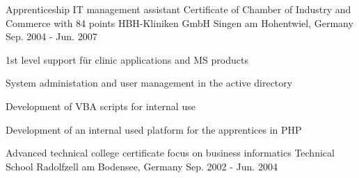

\begin{cventries}

  \cventry
    {Apprenticeship IT management assistant Certificate of Chamber of Industry and Commerce with 84 points} %
    {HBH-Kliniken GmbH} %
    {Singen am Hohentwiel, Germany} %
    {Sep. 2004 - Jun. 2007} %
    {
      \begin{cvitems} %
        \item {1st level support für clinic applications and MS products}
        \item {System administation and user management in the active directory}
        \item {Development of VBA scripts for internal use}
        \item {Development of an internal used platform for the apprentices in PHP}
      \end{cvitems}
    }

  \cventry
    {Advanced technical college certificate  focus on business informatics} %
    {Technical School} %
    {Radolfzell am Bodensee, Germany} %
    {Sep. 2002 - Jun. 2004} %
    {}

\end{cventries}
